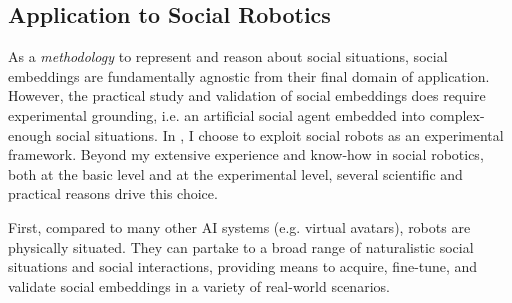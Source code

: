 

%
%

\subsection{Application to Social Robotics}

As a \emph{methodology} to represent and reason about social situations, social
embeddings are fundamentally agnostic from their final domain of application.
However, the practical study and validation of social embeddings does require
experimental grounding, i.e. an artificial social agent embedded into
complex-enough social situations. In \project, I choose to exploit social robots
as an experimental framework.  Beyond my extensive experience and know-how in
social robotics, both at the basic level and at the experimental level, several
scientific and practical reasons drive this choice.

First, compared to many other AI systems (e.g. virtual avatars), robots
are physically situated.  They can partake to a broad range of naturalistic
social situations and social interactions, providing means to acquire,
fine-tune, and validate social embeddings in a variety of real-world scenarios.

